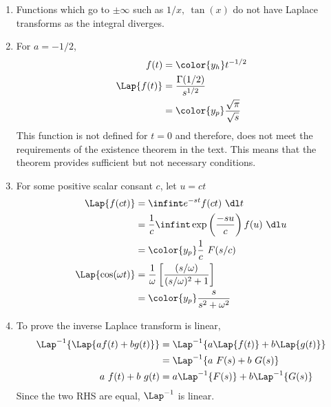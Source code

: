 \begin{enumerate}
      \item Functions which go to $ \pm \infty $ such as $ 1/x,\ \tan(x)$ do not have
            Laplace transforms as the integral diverges.

      \item For $ a = -1/2 $,
            \begin{align}
                  f(t)         & = \color{y_h} t^{-1/2}                    \\
                  \Lap\{f(t)\} & = \frac{\Gamma(1/2)}{s^{1/2}}             \\
                               & = \color{y_p} \frac{\sqrt{\pi}}{\sqrt{s}}
            \end{align}
            This function is not defined for $ t=0 $ and therefore, does not meet the
            requirements of the existence theorem in the text. This means that the
            theorem provides sufficient but not necessary conditions.

      \item For some positive scalar consant $ c $, let $ u = ct $
            \begin{align}
                  \Lap\{f(ct)\}          & = \infint e^{-st}f(ct)\ \dl t               \\
                                         & = \frac{1}{c}\infint \exp
                  \left( \frac{-su}{c} \right) f(u)\ \dl u                             \\
                                         & = \color{y_p}\frac{1}{c}\ F(s/c)            \\
                  \Lap\{\cos(\omega t)\} & = \frac{1}{\omega} \left[ \frac{(s/\omega)}
                  {(s/\omega)^2 + 1} \right]                                           \\
                                         & = \color{y_p} \frac{s}{s^2 + \omega^2}
            \end{align}

      \item To prove the inverse Laplace transform is linear,
            \begin{align}
                  \Lap^{-1}\{\Lap\{af(t) + bg(t)\}\} & = \Lap^{-1}\{a \Lap\{f(t)\}
                  + b \Lap\{g(t)\}\}                                                   \\
                                                     & =\Lap^{-1}\{a\ F(s) + b\ G(s)\} \\
                  a\ f(t) + b\ g(t)                  & = a \Lap^{-1}\{F(s)\} +
                  b \Lap^{-1}\{G(s)\}
            \end{align}
            Since the two RHS are equal, $ \Lap^{-1} $ is linear.


\end{enumerate}
